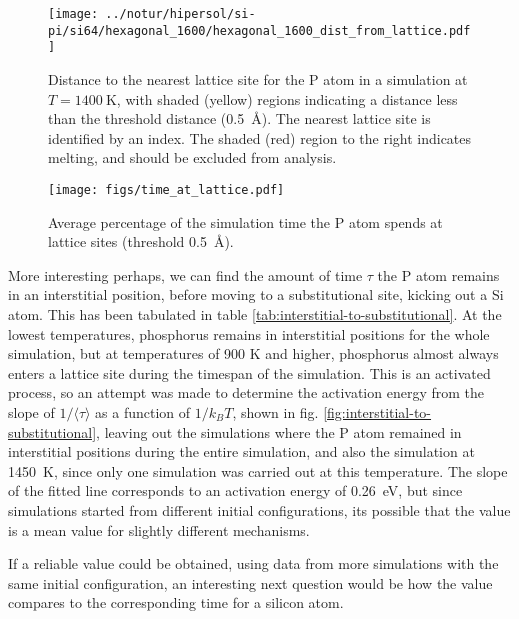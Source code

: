 \documentclass[11pt,bibliography=totoc,index=totoc]{scrbook}   %
\begin{document}
\begin{figure}[htbp]
  \centering
  \texttt{[image: ../notur/hipersol/si-pi/si64/hexagonal\_1600/hexagonal\_1600\_dist\_from\_lattice.pdf]}
  \caption{
      Distance to the nearest lattice site for the P atom in a simulation at $T=\SI{1400}{\kelvin}$,
      with shaded (yellow) regions indicating a distance less than the threshold distance (0.5~Å).
      The nearest lattice site is identified by an index. The shaded (red) region to the right indicates melting, and should be excluded from analysis.
  }
  \label{fig:distsite1400}
\end{figure}

\begin{figure}[htbp]
  \centering
  \texttt{[image: figs/time\_at\_lattice.pdf]}
  \caption{Average percentage of the simulation time the P atom spends at lattice sites (threshold 0.5~Å).
  }
  \label{fig:timelattsite}
\end{figure}

More interesting perhaps, we can find the amount of time $\tau$ the P atom remains in an interstitial position,
before moving to a substitutional site, kicking out a Si atom.
This has been tabulated in table \ref{tab:interstitial-to-substitutional}.
At the lowest temperatures, phosphorus remains in interstitial positions for the whole simulation, 
but at temperatures of 900 K and higher, 
phosphorus almost always enters a lattice site during the timespan of the simulation.
This is an activated process, so an attempt was made to determine the activation energy from the slope of $1/\langle\tau\rangle$ as a function of $1/k_BT$, 
shown in fig. \ref{fig:interstitial-to-substitutional}, leaving out the simulations where the P atom remained in interstitial positions during the entire simulation,
and also the simulation at 1450~K, since only one simulation was carried out at this temperature.
The slope of the fitted line corresponds to an activation energy of 0.26~eV, 
but since simulations started from different initial configurations, 
its possible that the value is a mean value for slightly different mechanisms.

If a reliable value could be obtained, using data from more simulations with the same initial configuration, 
an interesting next question would be how the value compares to the corresponding time for a silicon atom.
\end{document}
